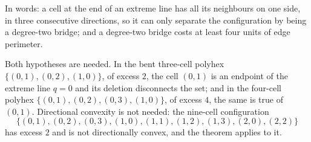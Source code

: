 \documentclass[11pt]{article}
\theoremstyle{plain}
\theoremstyle{definition}
\theoremstyle{remark}
\begin{document}
In words: a cell at the end of an extreme line has all its neighbours on one side, in three
consecutive directions, so it can only separate the configuration by being a degree-two
bridge; and a degree-two bridge costs at least four units of edge perimeter.

Both hypotheses are needed. In the bent three-cell polyhex \(\{(0,1),(0,2),(1,0)\}\), of
excess \(2\), the cell \((0,1)\) is an endpoint of the extreme line \(q=0\) and its deletion
disconnects the set; and in the four-cell polyhex \(\{(0,1),(0,2),(0,3),(1,0)\}\), of excess
\(4\), the same is true of \((0,1)\). Directional convexity is not needed: the nine-cell
configuration
\[
   \{(0,1),(0,2),(0,3),(1,0),(1,1),(1,2),(1,3),(2,0),(2,2)\}
\]
has excess \(2\) and is not directionally convex, and the theorem applies to it.



\end{document}
